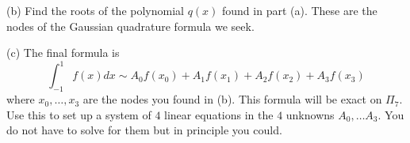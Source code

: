 \documentclass[12 pt]{article}
\begin{document}
\noindent
(b) Find the roots of the polynomial $q(x)$ found in part (a). These are the nodes of the Gaussian quadrature formula we seek. 

\noindent
(c) The final formula is 
$$
\int_{-1}^{1} f(x) dx \sim A_0f(x_0) + A_1f(x_1) + A_2f(x_2) + A_3f(x_3)
$$
where $x_0, \dots, x_3$ are the nodes you found in (b). This formula will be exact on $\Pi_7$. Use this to set up a system of $4$ linear equations 
in the $4$ unknowns $A_0, \dots A_3$. You do not have to solve for them but in principle you could. 
\end{document}
